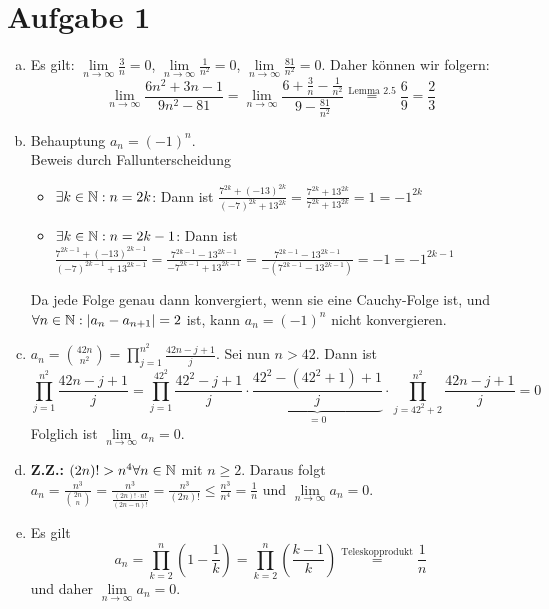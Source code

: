 \documentclass{article}
\newcommand{\mylim}{\lim\limits_{n\to \infty}}
\begin{document}
	\section*{Aufgabe 1}
	\begin{enumerate}[(a)]
		\item Es gilt: $\mylim \frac{3}{n} = 0$, $\mylim \frac{1}{n^2} = 0$, $\mylim \frac{81}{n^2} = 0$.
		Daher können wir folgern: 
		$$\mylim \frac{6n^2 + 3n - 1}{9n^2 - 81} = \mylim \frac{6 + \frac{3}{n} - \frac{1}{n^2}}{9 - \frac{81}{n^2}} \overset{\text{Lemma 2.5}}{=} \frac{6}{9} = \frac{2}{3}$$
		\item Behauptung $a_n = (-1)^n$.\\
		Beweis durch Fallunterscheidung
		\begin{itemize}
			\item $\exists k\in \mathbb{N}: n = 2k$: Dann ist $\frac{7^{2k} + (-13)^{2k}}{(-7)^{2k} + 13^{2k}} = \frac{7^{2k} + 13^{2k}}{7^{2k} + 13^{2k}} = 1 = -1^{2k}$
			\item $\exists k\in \mathbb{N}: n = 2k-1$: Dann ist $\frac{7^{2k-1} + (-13)^{2k-1}}{(-7)^{2k-1} + 13^{2k-1}} = \frac{7^{2k-1} - 13^{2k-1}}{-7^{2k-1} + 13^{2k-1}} = \frac{7^{2k-1} - 13^{2k-1}}{-(7^{2k-1} - 13^{2k-1})}  = -1 = -1^{2k-1}$
		\end{itemize}
		Da jede Folge genau dann konvergiert, wenn sie eine Cauchy-Folge ist, und $\forall n\in \mathbb{N}: |a_n -a_{n+1}| = 2$ ist, kann $a_n = (-1)^n$ nicht konvergieren.
		\item $a_n = \binom{42 n}{n^2} = \prod_{j=1}^{n^2}\frac{42n - j + 1}{j}$. Sei nun $n > 42$. Dann ist 
		$$\prod_{j=1}^{n^2}\frac{42n - j + 1}{j} = \prod_{j=1}^{42^2}\frac{42^2 - j + 1}{j} \cdot \underbrace{\frac{42^2 - (42^2 +1) + 1}{j}}_{ = 0} \cdot \prod_{j=42^2 + 2}^{n^2} \frac{42n - j + 1}{j} = 0$$
		Folglich ist $\mylim a_n = 0$.
		\item \textbf{Z.Z.:} $(2n)! > n^4 \forall n\in \mathbb{N}$ mit $n\geq 2$.
		Daraus folgt $a_n = \frac{n^3}{\binom{2n}{n}} = \frac{n^3}{\frac{(2n)! \cdot n!}{(2n-n)!}} = \frac{n^3}{(2n)!} \leq \frac{n^3}{n^4} = \frac{1}{n}$ und $\mylim a_n = 0$.
		\item Es gilt
		$$a_n = \prod_{k=2}^{n} \left(1-\frac{1}{k}\right) = \prod_{k=2}^{n} \left(\frac{k-1}{k}\right) \overset{\text{Teleskopprodukt}}{=} \frac{1}{n}$$ und daher $\mylim a_n = 0$.

\end{enumerate}
\end{document}
